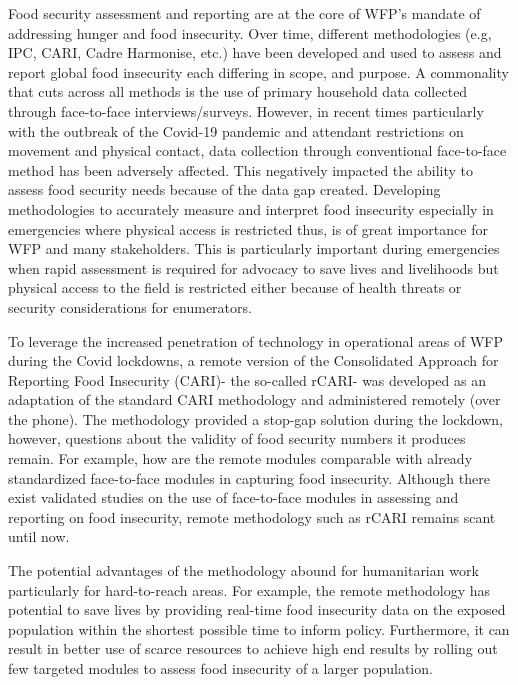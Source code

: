 \documentclass[11pt,harvard]{article}
\begin{document}
Food security assessment and reporting are at the core of WFP’s mandate of addressing hunger and food insecurity. Over time, different methodologies (e.g, IPC, CARI, Cadre Harmonise, etc.) have been developed and used to assess and report global food insecurity each differing in scope, and purpose. A commonality that cuts across all methods is the use of primary household data collected through face-to-face interviews/surveys. However, in recent times particularly with the outbreak of the Covid-19 pandemic and attendant restrictions on movement and physical contact, data collection through conventional face-to-face method has been adversely affected. This negatively impacted the ability to assess food security needs because of the data gap created. Developing methodologies to accurately measure and interpret food insecurity especially in emergencies where physical access is restricted thus, is of great importance for WFP and many stakeholders. This is particularly important during emergencies when rapid assessment is required for advocacy to save lives and livelihoods but physical access to the field is restricted either because of health threats or security considerations for enumerators. 

To leverage the increased penetration of technology in operational areas of WFP during the Covid lockdowns, a remote version of the Consolidated Approach for Reporting Food Insecurity (CARI)- the so-called rCARI- was developed as an adaptation of the standard CARI methodology and administered remotely (over the phone). The methodology provided a stop-gap solution during the lockdown, however, questions about the validity of food security numbers it produces remain. For example, how are the remote modules comparable with already standardized face-to-face modules in capturing food insecurity. Although there exist validated studies on the use of face-to-face modules in assessing and reporting on food insecurity, remote methodology such as rCARI remains scant until now. 

The potential advantages of the methodology abound for humanitarian work particularly for hard-to-reach areas. For example, the remote methodology has potential to save lives by providing real-time food insecurity data on the exposed population within the shortest possible time to inform policy. Furthermore, it can result in better use of scarce resources to achieve high end results by rolling out few targeted modules to assess food insecurity of a larger population.  	
\end{document}
